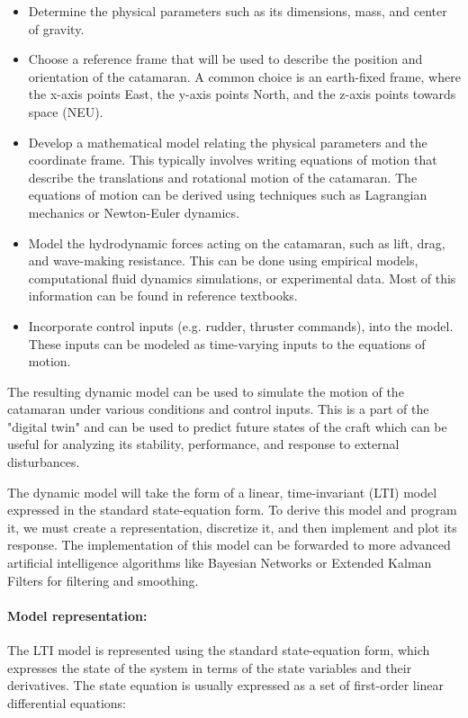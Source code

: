 \begin{itemize}
    \item Determine the physical parameters such as its dimensions, mass, and center of gravity. 
    \item Choose a reference frame that will be used to describe the position and orientation of the catamaran. 
    A common choice is an earth-fixed frame, where the x-axis points East, the y-axis points North, and the z-axis points towards space (NEU).
    \item Develop a mathematical model relating the physical parameters and the coordinate frame. 
    This typically involves writing equations of motion that describe the translations and rotational motion of the catamaran. 
    The equations of motion can be derived using techniques such as Lagrangian mechanics or Newton-Euler dynamics.
    \item Model the hydrodynamic forces acting on the catamaran, such as lift, drag, and wave-making resistance. 
    This can be done using empirical models, computational fluid dynamics simulations, or experimental data. 
    Most of this information can be found in reference textbooks.
    \item Incorporate control inputs (e.g. rudder, thruster commands), into the model. 
    These inputs can be modeled as time-varying inputs to the equations of motion.
\end{itemize}

The resulting dynamic model can be used to simulate the motion of the catamaran under various conditions and control inputs. 
This is a part of the "digital twin" and can be used to predict future states of the craft which can be useful for analyzing its stability, performance, and response to external disturbances. 

The dynamic model will take the form of a linear, time-invariant (LTI) model expressed in the standard state-equation form.
To derive this model and program it, we must create a representation, discretize it, and then implement and plot its response.
The implementation of this model can be forwarded to more advanced artificial intelligence algorithms like Bayesian Networks or Extended Kalman Filters for filtering and smoothing.

\paragraph*{Model representation:} The LTI model is represented using the standard state-equation form, which expresses the state of the system in terms of the state variables and their derivatives. The state equation is usually expressed as a set of first-order linear differential equations:

